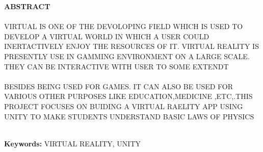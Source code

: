 \begin{center}
\thispagestyle{empty}
\vspace{2cm}
\LARGE{\textbf{ABSTRACT}}\\[1.0cm]
\end{center}
\thispagestyle{empty}
\large{\paragraph{}VIRTUAL IS ONE OF THE DEVOLOPING FIELD WHICH IS USED TO DEVELOP A VIRTUAL WORLD IN WHICH A USER COULD INERTACTIVELY ENJOY THE RESOURCES OF IT. VIRTUAL REALITY IS PRESENTLY USE IN GAMMING ENVIRONMENT ON A LARGE SCALE. THEY CAN BE INTERACTIVE WITH USER TO SOME EXTENDT }
\large{\paragraph{}BESIDES BEING USED FOR GAMES. IT CAN ALSO BE USED FOR VARIOUS OTHER PURPOSES LIKE EDUCATION,MEDICINE ,ETC,.THIS PROJECT FOCUSES ON BUIDING A VIRTUAL RAELITY APP USING UNITY TO MAKE STUDENTS UNDERSTAND BASIC LAWS OF PHYSICS}\\

\textbf{Keywords: }VIRTUAL REALITY, UNITY